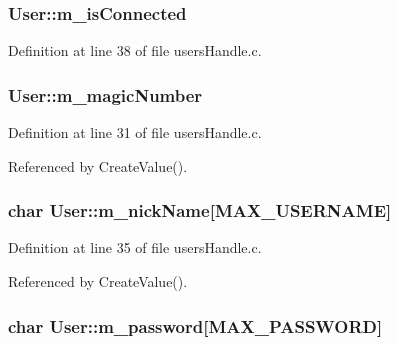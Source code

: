 \subsubsection[{\texorpdfstring{m\+\_\+is\+Connected}{m_isConnected}}]{ User\+::m\+\_\+is\+Connected}\hypertarget{structUser_aa3f8d2f1da5048f5e13499aa64bb41d9}{}\label{structUser_aa3f8d2f1da5048f5e13499aa64bb41d9}


Definition at line 38 of file users\+Handle.\+c.

\subsubsection[{\texorpdfstring{m\+\_\+magic\+Number}{m_magicNumber}}]{ User\+::m\+\_\+magic\+Number}\hypertarget{structUser_a19ebfc0785dfc3e5eeb33e843e5c8ebb}{}\label{structUser_a19ebfc0785dfc3e5eeb33e843e5c8ebb}


Definition at line 31 of file users\+Handle.\+c.



Referenced by Create\+Value().

\subsubsection[{\texorpdfstring{m\+\_\+nick\+Name}{m_nickName}}]{\setlength{\rightskip}{0pt plus 5cm}char User\+::m\+\_\+nick\+Name\mbox{[}{\bf M\+A\+X\+\_\+\+U\+S\+E\+R\+N\+A\+ME}\mbox{]}}\hypertarget{structUser_a14a68112d918e8d752ec614133fa2065}{}\label{structUser_a14a68112d918e8d752ec614133fa2065}


Definition at line 35 of file users\+Handle.\+c.



Referenced by Create\+Value().

\subsubsection[{\texorpdfstring{m\+\_\+password}{m_password}}]{\setlength{\rightskip}{0pt plus 5cm}char User\+::m\+\_\+password\mbox{[}{\bf M\+A\+X\+\_\+\+P\+A\+S\+S\+W\+O\+RD}\mbox{]}}\hypertarget{structUser_afcd5f5b3dfd0847cbfbbb5c8b3cc9bb0}{}\label{structUser_afcd5f5b3dfd0847cbfbbb5c8b3cc9bb0}


